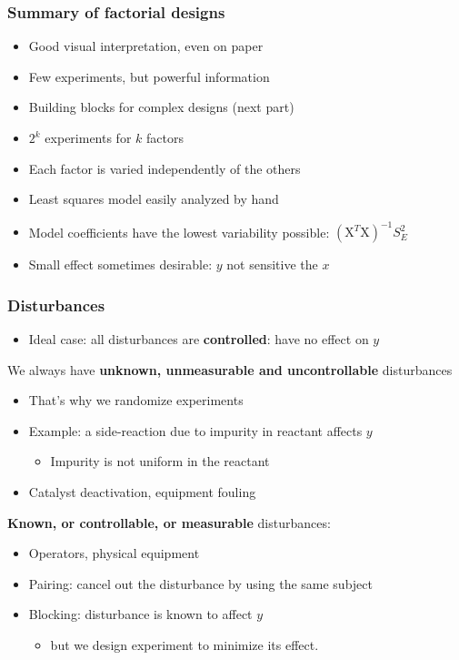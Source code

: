 \begin{frame}\frametitle{Summary of factorial designs}
	\begin{itemize}
		\item	Good visual interpretation, even on paper
		\item	Few experiments, but powerful information
		\item	Building blocks for complex designs (next part)
		\item	$2^k$ experiments for $k$ factors
		\item	Each factor is varied independently of the others
		\item	Least squares model easily analyzed by hand
		\item	Model coefficients have the lowest variability possible: $(\mathrm{X}^T\mathrm{X})^{-1}S_E^2$
		\item	Small effect sometimes desirable: $y$ not sensitive the $x$
	\end{itemize}
\end{frame}

\begin{frame}\frametitle{Disturbances}
	\begin{itemize}
		\item	Ideal case: all disturbances are \textbf{controlled}: have no effect on $y$
	\end{itemize}

	We always have \textbf{unknown, unmeasurable and uncontrollable} disturbances
	\begin{itemize}
		\item	That's why we randomize experiments
		\item	Example: a side-reaction due to impurity in reactant affects $y$
		\begin{itemize}
			\item	Impurity is not uniform in the reactant
		\end{itemize}
		\item	Catalyst deactivation, equipment fouling
	\end{itemize}

	\textbf{Known, or controllable, or measurable} disturbances:
	\begin{itemize}
		\item	Operators, physical equipment
		\item	Pairing: cancel out the disturbance by using the same subject
		\item	Blocking: disturbance is known to affect $y$
		\begin{itemize}
			\item	but we design experiment to minimize its effect.
		\end{itemize}
	\end{itemize}
\end{frame}

